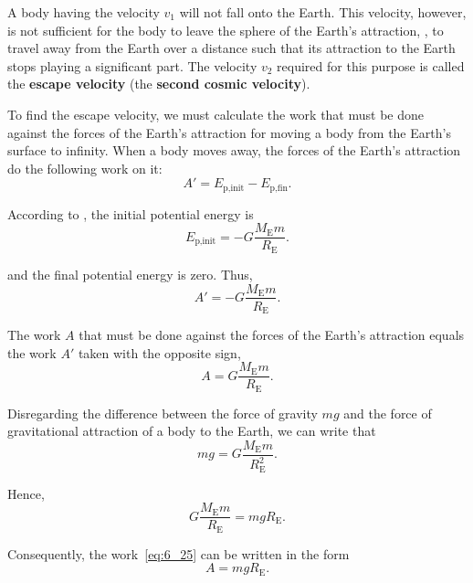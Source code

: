 A body having the velocity $v_1$ will not fall onto the Earth. This velocity, however, is not sufficient for the body to leave the sphere of the Earth's attraction, \ie, to travel away from the Earth over a distance such that its attraction to the Earth stops playing a significant part. The velocity $v_2$ required for this purpose is called the \textbf{escape velocity} (the \textbf{second cosmic velocity}).

To find the escape velocity, we must calculate the work that must be done against the forces of the Earth's attraction for moving a body from the Earth's surface to infinity. When a body moves away, the forces of the Earth's attraction do the following work on it:
\begin{equation*}
	A' = E_{\text{p,init}} - E_{\text{p,fin}}.
\end{equation*}

\noindent
According to , the initial potential energy is
\begin{equation*}
	E_{\text{p,init}} = -G\frac{M_{\text{E}}m}{R_{\text{E}}}.
\end{equation*}

\noindent
and the final potential energy is zero. Thus,
\begin{equation*}
	A' = -G\frac{M_{\text{E}}m}{R_{\text{E}}}.
\end{equation*}

\noindent
The work $A$ that must be done against the forces of the Earth's attraction equals the work $A'$ taken with the opposite sign, \ie
\begin{equation}\label{eq:6_25}
	A = G\frac{M_{\text{E}}m}{R_{\text{E}}}.
\end{equation}

Disregarding the difference between the force of gravity $mg$ and the force of gravitational attraction of a body to the Earth, we can write that
\begin{equation*}
	mg = G\frac{M_{\text{E}}m}{R_{\text{E}}^2}.
\end{equation*}

\noindent
Hence,
\begin{equation*}
	G\frac{M_{\text{E}}m}{R_{\text{E}}} = mgR_{\text{E}}.
\end{equation*}

\noindent
Consequently, the work~\eqref{eq:6_25} can be written in the form
\begin{equation}\label{eq:6_26}
	A = mgR_{\text{E}}.
\end{equation}

